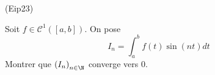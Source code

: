 \begin{tiny}(Eip23)\end{tiny} Soit $f\in \mathcal{C}^1([a,b])$. On pose
\begin{displaymath}
 I_n = \int_a^bf(t)\sin(nt)dt
\end{displaymath}
Montrer que $\left( I_n\right) _{n\in \N}$ converge vers $0$. 